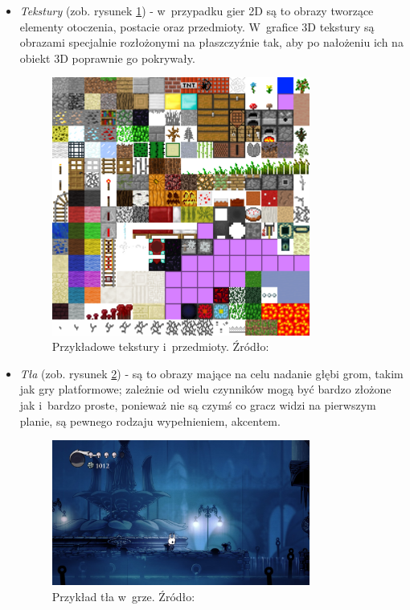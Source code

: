 \documentclass[12pt,a4paper,oneside]{book}
\theoremstyle{definition}
\numberwithin{equation}{chapter}
\begin{document}
\begin{itemize}

\item \textit{Tekstury} (zob. rysunek \ref{Textures}) - w~przypadku gier 2D są to obrazy tworzące elementy otoczenia, postacie oraz przedmioty. W~grafice 3D tekstury są obrazami specjalnie rozłożonymi na płaszczyźnie tak, aby po nałożeniu ich na obiekt 3D poprawnie go pokrywały.

\begin{figure}[hpt!]
        \centering
        \includegraphics[width=0.8\textwidth]{images/tex2D.png}
        \caption{Przykładowe tekstury i~przedmioty. Źródło: \cite{Textures}}
        \label{Textures}
\end{figure}

\item \textit{Tła} (zob. rysunek \ref{Background}) - są to obrazy mające na celu nadanie głębi grom, takim jak gry platformowe; zależnie od wielu czynników mogą być bardzo złożone jak i~bardzo proste, ponieważ nie są czymś co gracz widzi na pierwszym planie, są pewnego rodzaju wypełnieniem, akcentem.

\begin{figure}[hpt!]
        \centering
        \includegraphics[width=0.8\textwidth]{images/bckGr.jpg}
        \caption{Przykład tła w~grze. Źródło: \cite{Background}}
        \label{Background}
\end{figure}


\end{itemize}
\end{document}
